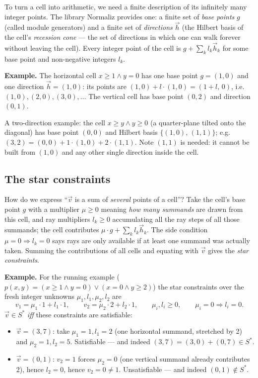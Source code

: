 \documentclass[11pt]{article}
\newcommand{\normaliz}{\textsf{Normaliz}\xspace}
\newcommand{\Sstar}{\ensuremath{S^{*}}}
\newcommand{\vv}{\ensuremath{\vec{v}}\xspace}
\begin{document}
To turn a cell into arithmetic, we need a finite description of its
infinitely many integer points. The library \normaliz provides one: a
finite set of \emph{base points} $g$ (called module generators) and a
finite set of \emph{directions} $\vec{h}$ (the Hilbert basis of the cell's
\emph{recession cone} --- the set of directions in which one can walk
forever without leaving the cell). Every integer point of the cell is
$g + \sum_k l_k \vec{h}_k$ for some base point and non-negative integers
$l_k$.

\begin{exbox}
\textbf{Example.} The horizontal cell $x \ge 1 \wedge y = 0$ has one base
point $g = (1,0)$ and one direction $\vec{h} = (1,0)$: its points are
$(1,0) + l \cdot (1,0) = (1{+}l,\, 0)$, i.e.\ $(1,0), (2,0), (3,0), \ldots$
The vertical cell has base point $(0,2)$ and direction $(0,1)$.

A two-direction example: the cell $x \ge y \wedge y \ge 0$ (a quarter-plane
tilted onto the diagonal) has base point $(0,0)$ and Hilbert basis
$\{(1,0),\, (1,1)\}$; e.g.\ $(3,2) = (0,0) + 1\cdot(1,0) + 2\cdot(1,1)$.
Note $(1,1)$ is needed: it cannot be built from $(1,0)$ and any other
single direction inside the cell.
\end{exbox}

\subsection{The star constraints}

How do we express ``$\vv$ is a sum of \emph{several} points of a cell''?
Take the cell's base point $g$ with a multiplier $\mu \ge 0$ meaning
\emph{how many summands} are drawn from this cell, and ray multipliers
$l_k \ge 0$ accumulating all the ray steps of all those summands; the cell
contributes $\mu \cdot g + \sum_k l_k \vec{h}_k$. The side condition $\mu =
0 \Rightarrow l_k = 0$ says rays are only available if at least one summand
was actually taken. Summing the contributions of all cells and equating
with $\vv$ gives the \emph{star constraints}.

\begin{exbox}
\textbf{Example.} For the running example
($p(x,y) = (x \ge 1 \wedge y = 0) \vee (x = 0 \wedge y \ge 2)$) the star
constraints over the fresh integer unknowns $\mu_1,l_1,\mu_2,l_2$ are
\[
v_1 = \mu_1 \cdot 1 + l_1 \cdot 1, \qquad
v_2 = \mu_2 \cdot 2 + l_2 \cdot 1, \qquad
\mu_i, l_i \ge 0, \qquad
\mu_i = 0 \Rightarrow l_i = 0 .
\]
$\vv \in \Sstar$ \emph{iff} these constraints are satisfiable:
\begin{itemize}
\item $\vv = (3,7)$: take $\mu_1 = 1, l_1 = 2$ (one horizontal summand,
  stretched by 2) and $\mu_2 = 1, l_2 = 5$. Satisfiable --- and indeed
  $(3,7) = (3,0) + (0,7) \in \Sstar$.
\item $\vv = (0,1)$: $v_2 = 1$ forces $\mu_2 = 0$ (one vertical summand
  already contributes $2$), hence $l_2 = 0$, hence $v_2 = 0 \ne 1$.
  Unsatisfiable --- and indeed $(0,1) \notin \Sstar$.
\end{itemize}
\end{exbox}
\end{document}
